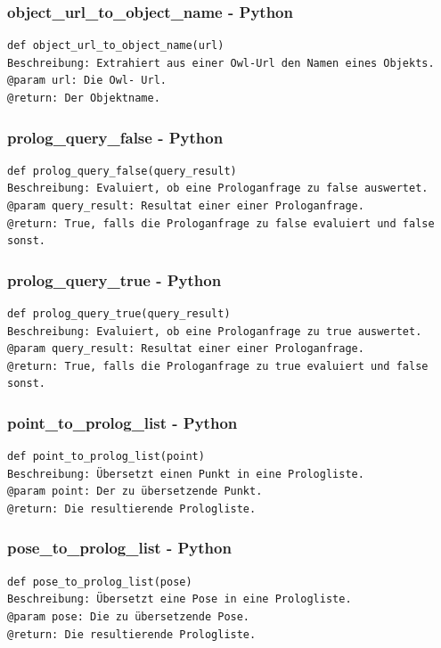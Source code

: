 \documentclass{suturo}
\begin{document}
\subsubsection{object\_url\_to\_object\_name - Python}
\begin{verbatim}
def object_url_to_object_name(url)
Beschreibung: Extrahiert aus einer Owl-Url den Namen eines Objekts.
@param url: Die Owl- Url.
@return: Der Objektname.
\end{verbatim}


\subsubsection{prolog\_query\_false - Python}
\begin{verbatim}
def prolog_query_false(query_result)
Beschreibung: Evaluiert, ob eine Prologanfrage zu false auswertet.
@param query_result: Resultat einer einer Prologanfrage.
@return: True, falls die Prologanfrage zu false evaluiert und false sonst.
\end{verbatim}

\subsubsection{prolog\_query\_true - Python}
\begin{verbatim}
def prolog_query_true(query_result)
Beschreibung: Evaluiert, ob eine Prologanfrage zu true auswertet.
@param query_result: Resultat einer einer Prologanfrage.
@return: True, falls die Prologanfrage zu true evaluiert und false sonst.
\end{verbatim}

\subsubsection{point\_to\_prolog\_list - Python}
\begin{verbatim}
def point_to_prolog_list(point)
Beschreibung: Übersetzt einen Punkt in eine Prologliste.
@param point: Der zu übersetzende Punkt.
@return: Die resultierende Prologliste.
\end{verbatim}

\subsubsection{pose\_to\_prolog\_list - Python}
\begin{verbatim}
def pose_to_prolog_list(pose)
Beschreibung: Übersetzt eine Pose in eine Prologliste.
@param pose: Die zu übersetzende Pose.
@return: Die resultierende Prologliste.
\end{verbatim}
\end{document}
